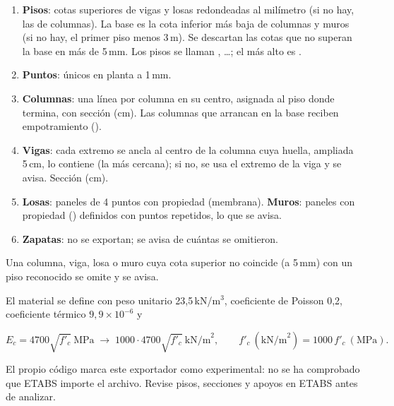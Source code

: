 \begin{enumerate}
	\item \textbf{Pisos}: cotas superiores de vigas y losas redondeadas al milímetro (si no hay, las de columnas). La
	      base es la cota inferior más baja de columnas y muros (si no hay, el primer piso menos 3\,m). Se descartan las
	      cotas que no superan la base en más de 5\,mm. Los pisos se llaman , \dots; el más alto
	      es .
	\item \textbf{Puntos}: únicos en planta a 1\,mm.
	\item \textbf{Columnas}: una línea por columna en su centro, asignada al piso donde termina, con sección
	       (cm). Las columnas que arrancan en la base reciben empotramiento
	      ().
	\item \textbf{Vigas}: cada extremo se ancla al centro de la columna cuya huella, ampliada 5\,cm, lo contiene (la más
	      cercana); si no, se usa el extremo de la viga y se avisa. Sección  (cm).
	\item \textbf{Losas}: paneles de 4 puntos con propiedad  (membrana).
	      \textbf{Muros}: paneles con propiedad  () definidos con puntos repetidos,
	      lo que se avisa.
	\item \textbf{Zapatas}: no se exportan; se avisa de cuántas se omitieron.
\end{enumerate}

Una columna, viga, losa o muro cuya cota superior no coincide (a 5\,mm) con un piso reconocido se omite y se avisa.

El material  se define con peso unitario 23,5\,kN/m$^3$, coeficiente de Poisson 0,2, coeficiente
térmico $9{,}9 \times 10^{-6}$ y

\begin{equation}
	E_c = 4700 \sqrt{f'_c} \ \text{MPa} \;\rightarrow\; 1000 \cdot 4700 \sqrt{f'_c}\ \text{kN/m}^2, \qquad
	f'_c\ (\text{kN/m}^2) = 1000\, f'_c\ (\text{MPa}).
\end{equation}

\begin{advertencia}
	El propio código marca este exportador como experimental: no se ha comprobado que ETABS importe el archivo. Revise
	pisos, secciones y apoyos en ETABS antes de analizar.
\end{advertencia}

